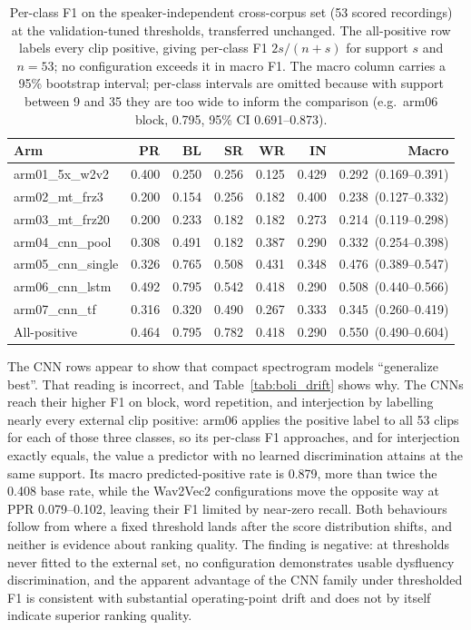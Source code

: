 \documentclass[a4paper,orivec]{llncs}
\newcommand{\ci}[1]{{\scriptsize\,(#1)}}
\begin{document}
\begin{table}[!htbp]
\caption{Per-class F1 on the speaker-independent cross-corpus set (53 scored
recordings) at the validation-tuned thresholds, transferred unchanged. The
all-positive row labels every clip positive, giving per-class F1 $2s/(n+s)$ for
support $s$ and $n=53$; no configuration exceeds it in macro F1. The macro column
carries a 95\% bootstrap interval; per-class intervals are omitted because with
support between 9 and 35 they are too wide to inform the comparison (e.g.\ arm06
block, 0.795, 95\% CI 0.691--0.873).}
\label{tab:boli_perclass}
\centering
\small
\renewcommand{\arraystretch}{0.9}
\begin{tabular}{lrrrrrr}
\hline
Arm & PR & BL & SR & WR & IN & Macro\\
\hline
arm01\_5x\_w2v2 & 0.400 & 0.250 & 0.256 & 0.125 & 0.429 & 0.292 \ci{0.169--0.391}\\
arm02\_mt\_frz3 & 0.200 & 0.154 & 0.256 & 0.182 & 0.400 & 0.238 \ci{0.127--0.332}\\
arm03\_mt\_frz20 & 0.200 & 0.233 & 0.182 & 0.182 & 0.273 & 0.214 \ci{0.119--0.298}\\
arm04\_cnn\_pool & 0.308 & 0.491 & 0.182 & 0.387 & 0.290 & 0.332 \ci{0.254--0.398}\\
arm05\_cnn\_single & 0.326 & 0.765 & 0.508 & 0.431 & 0.348 & 0.476 \ci{0.389--0.547}\\
arm06\_cnn\_lstm & 0.492 & 0.795 & 0.542 & 0.418 & 0.290 & 0.508 \ci{0.440--0.566}\\
arm07\_cnn\_tf & 0.316 & 0.320 & 0.490 & 0.267 & 0.333 & 0.345 \ci{0.260--0.419}\\
\hline
All-positive & 0.464 & 0.795 & 0.782 & 0.418 & 0.290 & 0.550 \ci{0.490--0.604}\\
\hline
\end{tabular}
\end{table}

The CNN rows appear to show that compact spectrogram models
``generalize best''. That reading is incorrect, and
Table~\ref{tab:boli_drift} shows why. The CNNs reach their higher F1 on block,
word repetition, and interjection by labelling nearly every external clip
positive: arm06 applies the positive label to all 53 clips for each of those
three classes, so its per-class F1 approaches, and for interjection exactly
equals, the value a predictor with no learned discrimination attains at the same
support. Its macro predicted-positive rate is 0.879, more than twice the 0.408
base rate, while the Wav2Vec2 configurations move the opposite way at PPR
0.079--0.102, leaving their F1 limited by near-zero recall. Both behaviours follow
from where a fixed threshold lands after the score distribution shifts, and
neither is evidence about ranking quality. The finding is negative: at thresholds
never fitted to the external set, no configuration
demonstrates usable dysfluency discrimination, and the apparent advantage of the
CNN family under thresholded F1 is consistent with substantial operating-point
drift and does not by itself indicate superior ranking quality.
\end{document}
